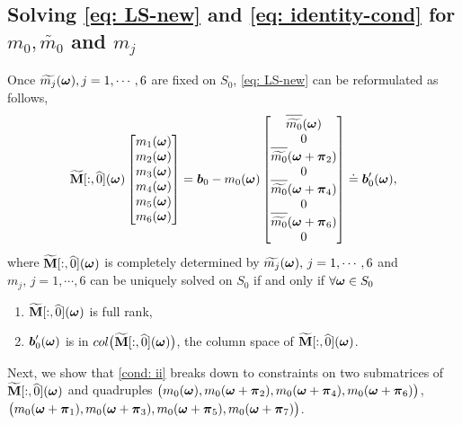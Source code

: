 \subsection{Solving \eqref{eq: LS-new} and \eqref{eq: identity-cond} for $m_0,\widetilde{m_0}$ and $m_j$}\label{subsec: compute-m0}
Once $\widetilde{m_{j}}(\boldsymbol{\omega}), j= 1,\cdots, 6$ are fixed on $S_0$, \eqref{eq: LS-new} can be reformulated as follows,
\begin{align}\label{eq: mj-eq}
\M[:,\widehat{0}](\V{\omega}) 
\begin{bmatrix}
m_1(\V{\omega})\\
m_2(\V{\omega})\\
m_3(\V{\omega})\\
m_4(\V{\omega})\\
m_5(\V{\omega})\\
m_6(\V{\omega})
\end{bmatrix}
= \V{b}_0 - m_0(\V{\omega})
\begin{bmatrix}
 \sbarm{0}\\
 0\\
\sbarmp{0}{2}\\
0\\
\sbarmp{0}{4}\\
0\\
\sbarmp{0}{6}\\
0
\end{bmatrix} \doteq \V{b}_0'(\V{\omega}),
\end{align}
where $\widetilde{\mathbf{M}}[:,\widehat{0}](\boldsymbol{\omega})$ is completely determined by $\widetilde{m_{j}}(\boldsymbol{\omega}),\,j = 1,\cdots,6$ 
and $m_j,\,j=1,\cdots,6$ can be uniquely solved on $S_0$ if and only if $\forall\boldsymbol{\omega}\in S_0$
\hspace{-1em}
\begin{enumerate}[leftmargin=.5in]
\item[\mylabel{cond: i}{(\ref{subsec: compute-m0}.i)}] $\widetilde{\mathbf{M}}[:,\widehat{0}](\boldsymbol{\omega})$ is full rank,%
\item[\mylabel{cond: ii}{(\ref{subsec: compute-m0}.ii)}] $\boldsymbol{b}_0'(\boldsymbol{\omega})$ is in $col\big(\widetilde{\mathbf{M}}[:,\widehat{0}](\boldsymbol{\omega})\big)$, the column space of $\widetilde{\mathbf{M}}[:,\widehat{0}](\boldsymbol{\omega})$.%
\end{enumerate}
Next, we show that \ref{cond: ii} breaks down to constraints on two submatrices of $\widetilde{\mathbf{M}}[:,\widehat{0}](\boldsymbol{\omega})$ and quadruples $\big( m_0(\boldsymbol{\omega}),m_0(\boldsymbol{\omega}+\boldsymbol{\pi}_2), m_0(\boldsymbol{\omega} +\boldsymbol{\pi}_4), m_0(\boldsymbol{\omega}+\boldsymbol{\pi}_6) \big)$, $\big( m_0(\boldsymbol{\omega}+\boldsymbol{\pi}_1),m_0(\boldsymbol{\omega}+\boldsymbol{\pi}_3), m_0(\boldsymbol{\omega} +\boldsymbol{\pi}_5), m_0(\boldsymbol{\omega}+\boldsymbol{\pi}_7) \big)$.
